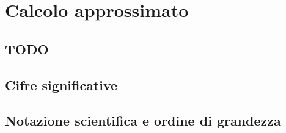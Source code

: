 
\chapter{Calcolo approssimato}

\section{TODO}

\section{Cifre significative}
\label{sec:01_cifresignificative}

% 

\section{Notazione scientifica e ordine di grandezza}
\label{sec:02_notscientifica}



